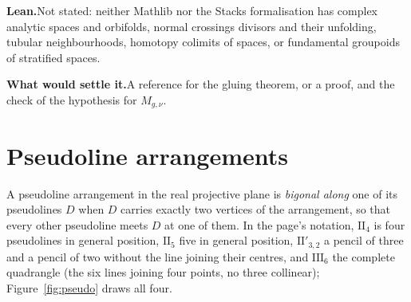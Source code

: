 \documentclass[11pt]{article}
\theoremstyle{definition}
\theoremstyle{plain}\newtheorem*{proposition}{Proposition}\theoremstyle{definition}
\newcommand{\entry}[1]{\par\medskip\noindent\textbf{#1}\enspace}
\newcommand{\leanst}{\entry{Lean.}}
\newcommand{\settle}{\entry{What would settle it.}}
\begin{document}
\leanst Not stated: neither Mathlib nor the Stacks formalisation \cite{axiomstacks} has complex analytic spaces and orbifolds, normal crossings divisors and their unfolding, tubular neighbourhoods, homotopy colimits of spaces, or fundamental groupoids of stratified spaces.

\settle A reference for the gluing theorem, or a proof, and the check of the hypothesis for $M_{g,\nu}$.

\section{Pseudoline arrangements}\label{sec:pseudo}

A pseudoline arrangement in the real projective plane is \emph{bigonal along} one of its pseudolines $D$ when $D$ carries exactly two vertices of the arrangement, so that every other pseudoline meets $D$ at one of them. In the page's notation, $\mathrm{II}_4$ is four pseudolines in general position, $\mathrm{II}_5$ five in general position, $\mathrm{II}'_{3,2}$ a pencil of three and a pencil of two without the line joining their centres, and $\mathrm{III}_6$ the complete quadrangle (the six lines joining four points, no three collinear); Figure~\ref{fig:pseudo} draws all four.
\end{document}
